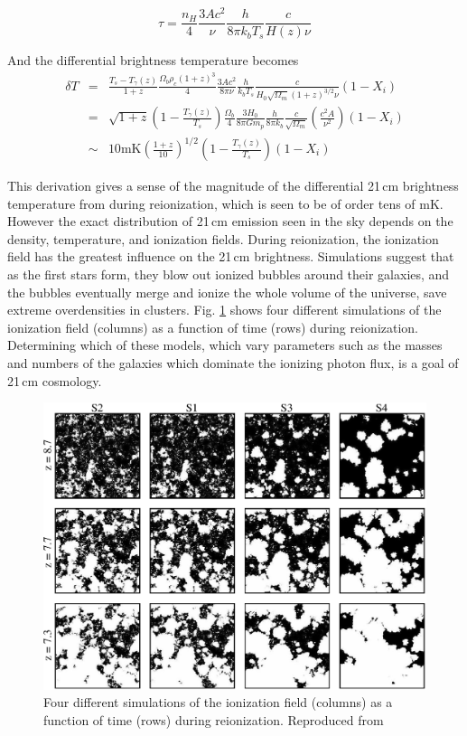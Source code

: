 \begin{equation}
\tau=\frac{n_H}{4}\frac{3Ac^2}{\nu}\frac{h}{8\pi k_bT_s}\frac{c}{H(z)\nu}
\end{equation}

And the differential brightness temperature becomes
\begin{eqnarray}
\delta T&=&\frac{T_s-T_\gamma(z)}{1+z}\frac{\Omega_b\rho_c(1+z)^3}{4}\frac{3Ac^2}{8\pi\nu}\frac{h}{k_bT_s}\frac{c}{H_0\sqrt{\Omega_m}(1+z)^{3/2}\nu}(1-X_i)\\
&=&\sqrt{1+z}\left(1-\frac{T_\gamma(z)}{T_s}\right)\frac{\Omega_b}{4}\frac{3H_0}{8\pi Gm_p}\frac{h}{8\pi k_b}\frac{c}  {\sqrt{\Omega_m}}\left(\frac{c^2A}{\nu^2}\right)(1-X_i)\\
&\sim &10\text{mK}\left(\frac{1+z}{10}\right)^{1/2}\left(1-\frac{T_\gamma(z)}{T_s}\right)(1-X_i)
\end{eqnarray}

This derivation gives a sense of the magnitude of the differential 21\,cm brightness temperature from during reionization, which is seen to be of order tens of mK. However the exact distribution of 21\,cm emission seen in the sky depends on the density, temperature, and ionization fields. During reionization, the ionization field has the greatest influence on the 21\,cm brightness. Simulations suggest that as the first stars form, they blow out ionized bubbles around their galaxies, and the bubbles eventually merge and ionize the whole volume of the universe, save extreme overdensities in clusters. Fig. \ref{fig:mcquinneorsims} shows four different simulations of the ionization field (columns) as a function of time (rows) during reionization. Determining which of these models, which vary parameters such as the masses and numbers of the galaxies which dominate the ionizing photon flux, is a goal of 21\,cm cosmology.

\begin{figure}
	\centering
	\includegraphics[width=6in]{chap0_intro/mcquinn_ionized_region_sims.eps}
	\caption[Four different simulations of the ionization field as a function of time.]{Four different simulations of the ionization field (columns) as a function of time (rows) during reionization. Reproduced from \citet{McQuinn06}}
	\label{fig:mcquinneorsims}
\end{figure}



